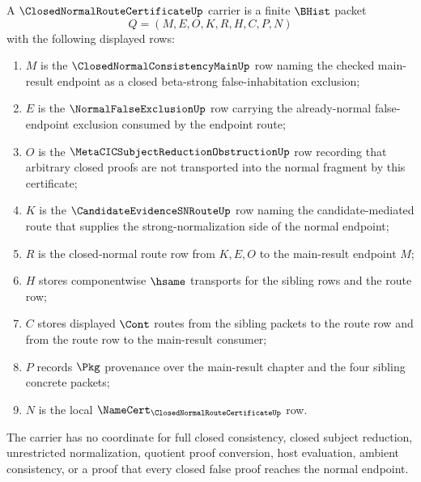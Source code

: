 \begin{definition}
\label{def:closed-normal-route-certificate-carrier}
A $\ClosedNormalRouteCertificateUp$ carrier is a finite $\BHist$ packet
$$
Q=(M,E,O,K,R,H,C,P,N)
$$
with the following displayed rows:
\begin{enumerate}
\item $M$ is the $\ClosedNormalConsistencyMainUp$ row naming the checked main-result endpoint as a closed beta-strong false-inhabitation exclusion;
\item $E$ is the $\NormalFalseExclusionUp$ row carrying the already-normal false-endpoint exclusion consumed by the endpoint route;
\item $O$ is the $\MetaCICSubjectReductionObstructionUp$ row recording that arbitrary closed proofs are not transported into the normal fragment by this certificate;
\item $K$ is the $\CandidateEvidenceSNRouteUp$ row naming the candidate-mediated route that supplies the strong-normalization side of the normal endpoint;
\item $R$ is the closed-normal route row from $K,E,O$ to the main-result endpoint $M$;
\item $H$ stores componentwise $\hsame$ transports for the sibling rows and the route row;
\item $C$ stores displayed $\Cont$ routes from the sibling packets to the route row and from the route row to the main-result consumer;
\item $P$ records $\Pkg$ provenance over the main-result chapter and the four sibling concrete packets;
\item $N$ is the local $\NameCert_{\ClosedNormalRouteCertificateUp}$ row.
\end{enumerate}
The carrier has no coordinate for full closed consistency, closed subject reduction, unrestricted normalization, quotient proof conversion, host evaluation, ambient consistency, or a proof that every closed false proof reaches the normal endpoint.
\end{definition}

